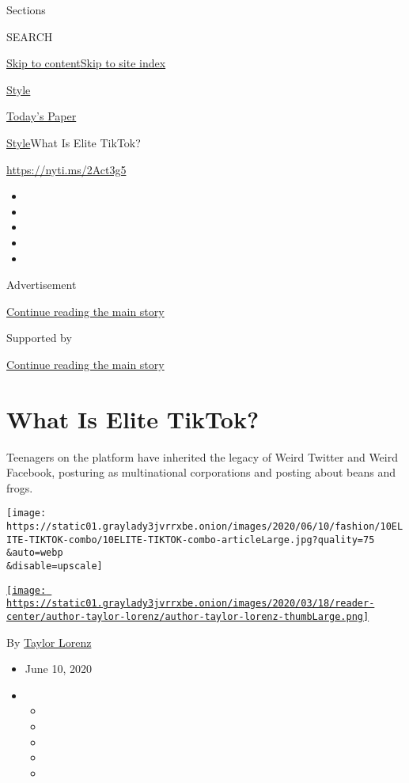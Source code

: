 Sections

SEARCH

\protect\hyperlink{site-content}{Skip to
content}\protect\hyperlink{site-index}{Skip to site index}

\href{https://www.nytimes3xbfgragh.onion/section/style}{Style}

\href{https://myaccount.nytimes3xbfgragh.onion/auth/login?response_type=cookie\&client_id=vi}{}

\href{https://www.nytimes3xbfgragh.onion/section/todayspaper}{Today's
Paper}

\href{/section/style}{Style}\textbar{}What Is Elite TikTok?

\url{https://nyti.ms/2Act3g5}

\begin{itemize}
\item
\item
\item
\item
\item
\end{itemize}

Advertisement

\protect\hyperlink{after-top}{Continue reading the main story}

Supported by

\protect\hyperlink{after-sponsor}{Continue reading the main story}

\hypertarget{what-is-elite-tiktok}{%
\section{What Is Elite TikTok?}\label{what-is-elite-tiktok}}

Teenagers on the platform have inherited the legacy of Weird Twitter and
Weird Facebook, posturing as multinational corporations and posting
about beans and frogs.

\texttt{[image: https://static01.graylady3jvrrxbe.onion/images/2020/06/10/fashion/10ELITE-TIKTOK-combo/10ELITE-TIKTOK-combo-articleLarge.jpg?quality=75\\\&auto=webp\\\&disable=upscale]}

\href{https://www.nytimes3xbfgragh.onion/by/taylor-lorenz}{\texttt{[image: https://static01.graylady3jvrrxbe.onion/images/2020/03/18/reader-center/author-taylor-lorenz/author-taylor-lorenz-thumbLarge.png]}}

By \href{https://www.nytimes3xbfgragh.onion/by/taylor-lorenz}{Taylor
Lorenz}

\begin{itemize}
\item
  June 10, 2020
\item
  \begin{itemize}
  \item
  \item
  \item
  \item
  \item
  \end{itemize}
\end{itemize}

